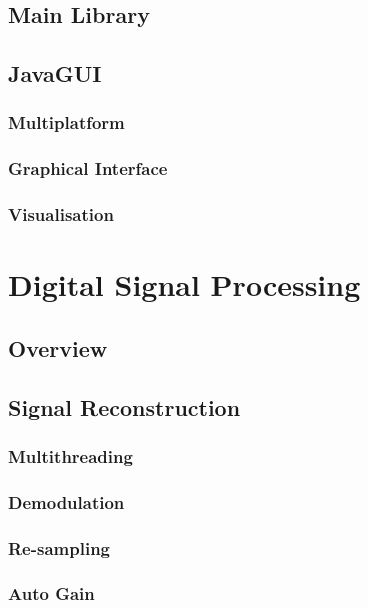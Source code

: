 \documentclass[a4paper,12pt,twoside,openright]{report}
\begin{document}
\subsection{Main Library}

\subsection{JavaGUI}

\subsubsection{Multiplatform}

\subsubsection{Graphical Interface}

\subsubsection{Visualisation}

\section{Digital Signal Processing}

\subsection{Overview}

\subsection{Signal Reconstruction}

\subsubsection{Multithreading}

\subsubsection{Demodulation}

\subsubsection{Re-sampling}

\subsubsection{Auto Gain}
\end{document}
